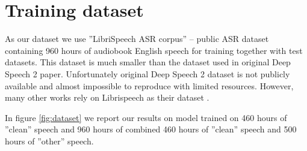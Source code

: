 \documentclass[licencjacka,en]{pracamgr}
\begin{document}
	
	\section{Training dataset}
	As our dataset we use ''LibriSpeech ASR corpus'' \cite{DATA} -- public ASR dataset containing 960 hours of audiobook English speech for training together with test datasets. This dataset is much smaller than the dataset used in original Deep Speech 2 paper. Unfortunately original Deep Speech 2 dataset is not publicly available and almost impossible to reproduce with limited resources. However, many other works rely on Librispeech as their dataset \cite{LIBRI-EX}.
	
	In figure \ref{fig:dataset} we report our results on model trained on 460 hours of ''clean'' speech and 960 hours of combined 460 hours of ''clean'' speech and 500 hours of ''other'' speech.
	
	\clean
	
\end{document}
